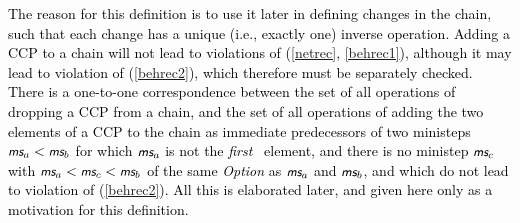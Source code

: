 \documentclass[a4paper,12pt,fleqn]{article}
\newcommand{\nnm}[1]{\textsf{\small\textit{#1}\ }}
\newcommand{\ms}{\textsl{\textsf{\small ms}}} %
\newcommand{\addca}[1]{{\textcolor[named]{Black}{#1}}}  %
\begin{document}
\addca{The reason for this definition is to use it later in
defining changes in the chain,
such that each change has a unique (i.e., exactly one) inverse operation.
Adding a CCP to a chain will not lead to violations of (\ref{netrec}, \ref{behrec1}),
although it may lead to violation of (\ref{behrec2}), which therefore
must be separately checked.
There is a one-to-one correspondence between the set of all operations of
dropping a CCP from a chain, and the set of all operations of
adding the two elements of a CCP to the chain
as immediate predecessors of two ministeps $\ms_a < \ms_b$
for which $\ms_a$ is not the \nnm{first} element, and there
is no ministep $\ms_c$ with $\ms_a < \ms_c < \ms_b$ of the same \textit{Option}
as $\ms_a$ and $\ms_b$, and which do not lead to violation of  (\ref{behrec2}).
All this is elaborated later, and given here only as a motivation for this definition.
}
\end{document}
